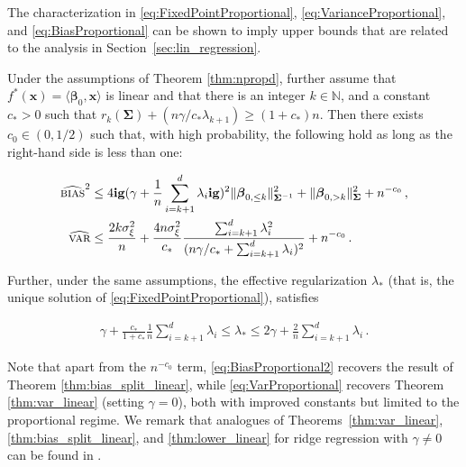 The characterization in \eqref{eq:FixedPointProportional},
\eqref{eq:VarianceProportional}, and \eqref{eq:BiasProportional}
can be shown to imply upper bounds that are related to the analysis in
Section~\ref{sec:lin_regression}.

\begin{corollary}
  Under the assumptions of Theorem \ref{thm:npropd}, further assume that $f^*({\boldsymbol x}) = \langle{\boldsymbol \beta}_0,{\boldsymbol x}\rangle$ is linear and that there is an integer $k\in{\mathbb N}$, and a constant $c_*>0$  such that  $r_k({\boldsymbol \Sigma})+(n\gamma/c_*\lambda_{k+1})\ge  (1+c_*)n$. Then there exists $c_0\in(0,1/2)$ such that, with high probability, the following hold as long as the right-hand side is less than one:

  \begin{align}
    {\widehat{\textsc{bias}}^2}  &\le
    4\mathbf{ig}(\gamma+\frac{1}{n}\sum_{i=k+1}^d\lambda_i\mathbf{ig})^2
    \|{\boldsymbol \beta}_{0,\le
    k}\|_{{\boldsymbol \Sigma}^{-1}}^2+\|{\boldsymbol \beta}_{0,>k}\|_{{\boldsymbol \Sigma}}^2+n^{-c_0}\,
    ,\label{eq:BiasProportional2}\\
    {\widehat{\textsc{var}}}& \le \frac{2k\sigma_\xi^2}{n} +
    \frac{4n \sigma_\xi^2}{c_*}
                  \frac{\sum_{i=k+1}^d \lambda_i^2}{(n\gamma/c_*+\sum_{i=k+1}^{d}\lambda_i)^2}+n^{-c_0}\, . \label{eq:VarProportional}
  \end{align}

  Further, under the same assumptions, the effective regularization $\lambda_*$
  (that is, the unique solution of \eqref{eq:FixedPointProportional}), satisfies

\begin{align}

  \gamma+\frac{c_*}{1+c_*}\frac{1}{n}\sum_{i=k+1}^{d}\lambda_i \le \lambda_*\le
  2\gamma+\frac{2}{n}\sum_{i=k+1}^d\lambda_i\, .

\end{align}
\end{corollary}
Note that apart from the $n^{-c_0}$ term,
\eqref{eq:BiasProportional2}
recovers the result of Theorem \ref{thm:bias_split_linear},
while \eqref{eq:VarProportional} recovers Theorem \ref{thm:var_linear}
(setting $\gamma=0$), both with improved constants but  limited to the proportional regime. We remark that analogues of Theorems~\ref{thm:var_linear}, \ref{thm:bias_split_linear}, and \ref{thm:lower_linear} for ridge regression with $\gamma\neq 0$ can be found in \cite{tsigler2020benign}.

